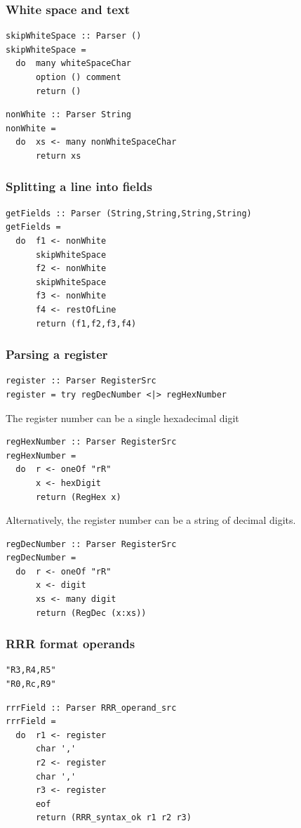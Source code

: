 \documentclass{beamer}
\begin{document}
\begin{frame}[fragile]
\frametitle{White space and text}

\begin{verbatim}
skipWhiteSpace :: Parser ()
skipWhiteSpace =
  do  many whiteSpaceChar
      option () comment
      return ()
\end{verbatim}

\begin{verbatim}
nonWhite :: Parser String
nonWhite =
  do  xs <- many nonWhiteSpaceChar
      return xs
\end{verbatim}

\end{frame}

\begin{frame}[fragile]
\frametitle{Splitting a line into fields}

\begin{verbatim}
getFields :: Parser (String,String,String,String)
getFields =
  do  f1 <- nonWhite
      skipWhiteSpace
      f2 <- nonWhite
      skipWhiteSpace
      f3 <- nonWhite
      f4 <- restOfLine
      return (f1,f2,f3,f4)
\end{verbatim}

\end{frame}

\begin{frame}[fragile]
\frametitle{Parsing a register}
{\small
\begin{verbatim}
register :: Parser RegisterSrc
register = try regDecNumber <|> regHexNumber
\end{verbatim}
}
The register number can be a single hexadecimal digit
{\small
\begin{verbatim}
regHexNumber :: Parser RegisterSrc
regHexNumber =
  do  r <- oneOf "rR"
      x <- hexDigit
      return (RegHex x)
\end{verbatim}
}
Alternatively, the register number can be a string of decimal
digits.
{\small
\begin{verbatim}
regDecNumber :: Parser RegisterSrc
regDecNumber =
  do  r <- oneOf "rR"
      x <- digit
      xs <- many digit
      return (RegDec (x:xs))
\end{verbatim}
}
\end{frame}

\begin{frame}[fragile]
\frametitle{RRR format operands}

\begin{verbatim}
"R3,R4,R5"
"R0,Rc,R9"
\end{verbatim}

\begin{verbatim}
rrrField :: Parser RRR_operand_src
rrrField =
  do  r1 <- register
      char ','
      r2 <- register
      char ','
      r3 <- register
      eof
      return (RRR_syntax_ok r1 r2 r3)
\end{verbatim}

\end{frame}
\end{document}
